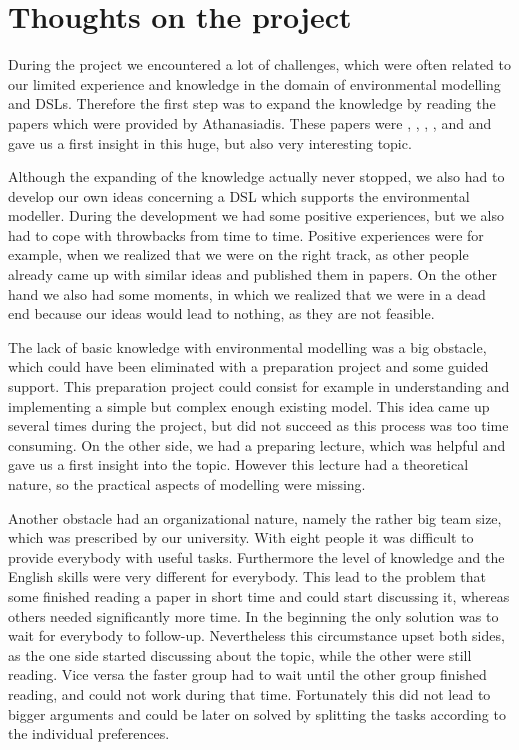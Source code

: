 \section{Thoughts on the project}
\par
During the project we encountered a lot of challenges, which were often related to our limited experience and knowledge in the domain of environmental modelling and DSLs. Therefore the first step was to expand the knowledge by reading the papers which were provided by Athanasiadis. These papers were \autocite{dsl:muetzelfeldt}, \autocite{ontology:oom_mapping}, \autocite{Villa2009577}, \autocite{Lloyd:2011:EMF:1994475.1995042}, \autocite{dsl:mernik} and \autocite{dsl:kelly} and gave us a first insight in this huge, but also very interesting topic. %
\par
Although the expanding of the knowledge actually never stopped, we also had to develop our own ideas concerning a DSL which supports the environmental modeller. During the development we had some positive experiences, but we also had to cope with throwbacks from time to time. Positive experiences were for example, when we realized that we were on the right track, as other people already came up with similar ideas and published them in papers. On the other hand we also had some moments, in which we realized that we were in a dead end because our ideas would lead to nothing, as they are not feasible.
\par
The lack of basic knowledge with environmental modelling was a big obstacle, which could have been eliminated with a preparation project and some guided support. This preparation project could consist for example in understanding and implementing a simple but complex enough existing model. This idea came up several times during the project, but did not succeed as this process was too time consuming. On the other side, we had a preparing lecture, which was helpful and gave us a first insight into the topic. However this lecture had a theoretical nature, so the practical aspects of modelling were missing.
\par
Another obstacle had an organizational nature, namely the rather big team size, which was prescribed by our university. With eight people it was difficult to provide everybody with useful tasks. Furthermore the level of knowledge and the English skills were very different for everybody. This lead to the problem that some finished reading a paper in short time and could start discussing it, whereas others needed significantly more time. In the beginning the only solution was to wait for everybody to follow-up. Nevertheless this circumstance upset both sides, as the one side started discussing about the topic, while the other were still reading. Vice versa the faster group had to wait until the other group finished reading, and could not work during that time. Fortunately this did not lead to bigger arguments and could be later on solved by splitting the tasks according to the individual preferences.
